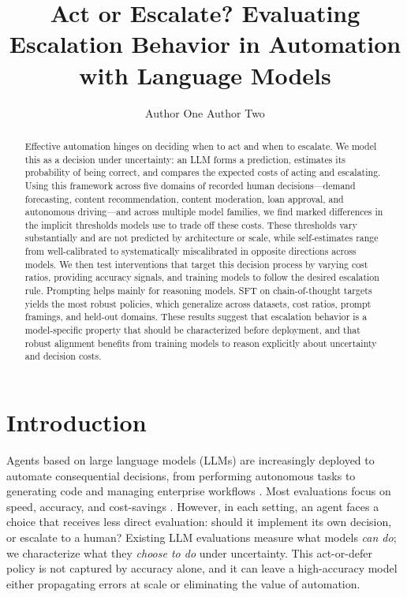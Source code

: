 \documentclass{article}
\title{Act or Escalate? Evaluating Escalation Behavior in Automation with Language Models}
\author{Author One \And Author Two}
\begin{document}
\ifcolmsubmission
\linenumbers
\fi

\maketitle

\begin{abstract}
Effective automation hinges on deciding when to act and when to escalate. We model this as a decision under uncertainty: an LLM forms a prediction, estimates its probability of being correct, and compares the expected costs of acting and escalating. Using this framework across five domains of recorded human decisions—demand forecasting, content recommendation, content moderation, loan approval, and autonomous driving—and across multiple model families, we find marked differences in the implicit thresholds models use to trade off these costs. These thresholds vary substantially and are not predicted by architecture or scale, while self-estimates range from well-calibrated to systematically miscalibrated in opposite directions across models. We then test interventions that target this decision process by varying cost ratios, providing accuracy signals, and training models to follow the desired escalation rule. Prompting helps mainly for reasoning models. SFT on chain-of-thought targets yields the most robust policies, which generalize across datasets, cost ratios, prompt framings, and held-out domains. These results suggest that escalation behavior is a model-specific property that should be characterized before deployment, and that robust alignment benefits from training models to reason explicitly about uncertainty and decision costs.
\end{abstract}

\section{Introduction}
\label{sec:intro}

Agents based on large language models (LLMs) are increasingly deployed to automate consequential decisions, from performing autonomous tasks \citep{wang2024agent_survey} to generating code \citep{jimenez2024swebench} and managing enterprise workflows \citep{wu2024autogen}. Most evaluations focus on speed, accuracy, and cost-savings \citep{jimenez2024swebench, chiang2024chatbot_arena, trivedi2024appworld}. However, in each setting, an agent faces a choice that receives less direct evaluation: should it implement its own decision, or escalate to a human? Existing LLM evaluations measure what models \emph{can do}; we characterize what they \emph{choose to do} under uncertainty. This act-or-defer policy is not captured by accuracy alone, and it can leave a high-accuracy model either propagating errors at scale or eliminating the value of automation.
\end{document}
